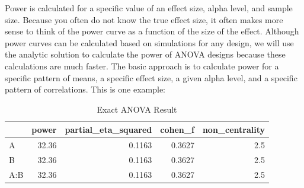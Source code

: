 \documentclass[]{book}
\newenvironment{Shaded}{\begin{snugshade}}{\end{snugshade}}
\newcommand{\CommentTok}[1]{\textcolor[rgb]{0.56,0.35,0.01}{\textit{#1}}}
\newcommand{\DataTypeTok}[1]{\textcolor[rgb]{0.13,0.29,0.53}{#1}}
\newcommand{\DecValTok}[1]{\textcolor[rgb]{0.00,0.00,0.81}{#1}}
\newcommand{\FloatTok}[1]{\textcolor[rgb]{0.00,0.00,0.81}{#1}}
\newcommand{\KeywordTok}[1]{\textcolor[rgb]{0.13,0.29,0.53}{\textbf{#1}}}
\newcommand{\NormalTok}[1]{#1}
\newcommand{\OtherTok}[1]{\textcolor[rgb]{0.56,0.35,0.01}{#1}}
\newcommand{\StringTok}[1]{\textcolor[rgb]{0.31,0.60,0.02}{#1}}
\begin{document}
Power is calculated for a specific value of an effect size, alpha level, and sample size. Because you often do not know the true effect size, it often makes more sense to think of the power curve as a function of the size of the effect. Although power curves can be calculated based on simulations for any design, we will use the analytic solution to calculate the power of ANOVA designs because these calculations are much faster. The basic approach is to calculate power for a specific pattern of means, a specific effect size, a given alpha level, and a specific pattern of correlations. This is one example:

\begin{Shaded}
\end{Shaded}

\begin{table}[!h]

\caption{\label{tab:unnamed-chunk-296}Exact ANOVA Result}
\centering
\begin{tabular}{l|r|r|r|r}
\hline
  & power & partial\_eta\_squared & cohen\_f & non\_centrality\\
\hline
A & 32.36 & 0.1163 & 0.3627 & 2.5\\
\hline
B & 32.36 & 0.1163 & 0.3627 & 2.5\\
\hline
A:B & 32.36 & 0.1163 & 0.3627 & 2.5\\
\hline
\end{tabular}
\end{table}
\end{document}
